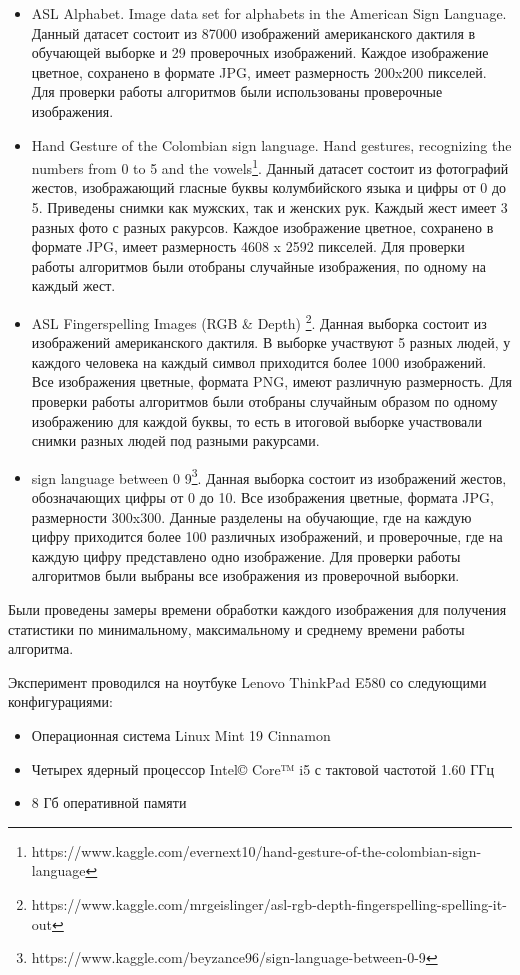 \begin{itemize}
	\item ASL Alphabet. Image data set for alphabets in the American Sign Language\cite{DelovayaNedelya}. Данный датасет состоит из 87000 изображений американского дактиля в обучающей выборке и 29 проверочных изображений. Каждое изображение цветное, сохранено в формате JPG, имеет размерность 200x200 пикселей. Для проверки работы алгоритмов были использованы проверочные изображения.
	
	\item Hand Gesture of the Colombian sign language. Hand gestures, recognizing the numbers from 0 to 5 and the vowels\footnote{https://www.kaggle.com/evernext10/hand-gesture-of-the-colombian-sign-language}. Данный датасет состоит из фотографий жестов, изображающий гласные буквы колумбийского языка и цифры от 0 до 5. Приведены снимки как мужских, так и женских рук. Каждый жест имеет 3 разных фото с разных ракурсов. Каждое изображение цветное, сохранено в формате JPG, имеет размерность 4608 x 2592 пикселей. Для проверки работы алгоритмов были отобраны случайные изображения, по одному на каждый жест.
	
	\item ASL Fingerspelling Images (RGB \& Depth) \footnote{https://www.kaggle.com/mrgeislinger/asl-rgb-depth-fingerspelling-spelling-it-out}. Данная выборка состоит из изображений американского дактиля. В выборке участвуют 5 разных людей, у каждого человека на каждый символ приходится более 1000 изображений. Все изображения цветные, формата PNG, имеют различную размерность. Для проверки работы алгоритмов были отобраны случайным образом по одному изображению для каждой буквы, то есть в итоговой выборке участвовали снимки разных людей под разными ракурсами.
	
	\item sign language between 0 9\footnote{https://www.kaggle.com/beyzance96/sign-language-between-0-9}. Данная выборка состоит из изображений жестов, обозначающих цифры от 0 до 10. Все изображения цветные, формата JPG, размерности 300x300. Данные разделены на обучающие, где на каждую цифру приходится более 100 различных изображений, и проверочные, где на каждую цифру представлено одно изображение. Для проверки работы алгоритмов были выбраны все изображения из проверочной выборки. 
	
\end{itemize}

 Были проведены замеры времени обработки каждого изображения для получения статистики по минимальному, максимальному и среднему времени работы алгоритма.
 
 Эксперимент проводился на ноутбуке Lenovo ThinkPad E580 со следующими конфигурациями:
 
 \begin{itemize}
 	\item Операционная система Linux Mint 19 Cinnamon
 	\item Четырех ядерный процессор Intel© Core™ i5 с тактовой частотой 1.60 ГГц
 	\item 8 Гб оперативной памяти
 \end{itemize}